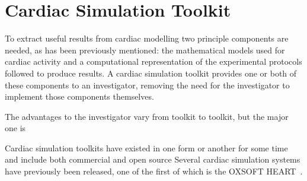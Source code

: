 \section{Cardiac Simulation Toolkit}

To extract useful results from cardiac modelling two principle
components are needed, as has been previously mentioned: the
mathematical models used for cardiac activity and a computational
representation of the experimental protocols followed to produce
results.  A cardiac simulation toolkit provides one or both of these
components to an investigator, removing the need for the investigator to
implement those components themselves.

The
advantages to the investigator vary from toolkit to toolkit, but the
major one is

Cardiac simulation toolkits have existed in one form or another for some
time and include both commercial and open source 
Several cardiac simulation systems have previously been released, one of
the first of which is the OXSOFT HEART~\cite{Noble-1999}.
